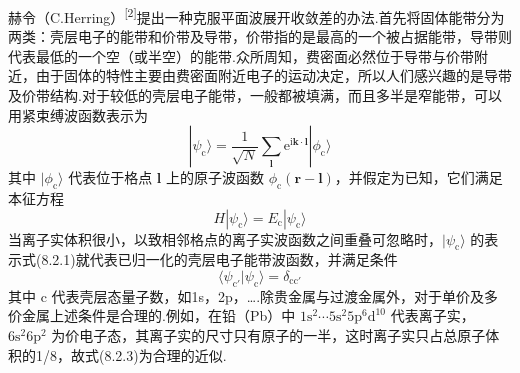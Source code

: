 赫令（C.Herring）\textsuperscript{[2]}提出一种克服平面波展开收敛差的办法.首先将固体能带分为两类：壳层电子的能带和价带及导带，价带指的是最高的一个被占据能带，导带则代表最低的一个空（或半空）的能带.众所周知，费密面必然位于导带与价带附近，由于固体的特性主要由费密面附近电子的运动决定，所以人们感兴趣的是导带及价带结构.对于较低的壳层电子能带，一般都被填满，而且多半是窄能带，可以用紧束缚波函数表示为
\begin{equation}
  |\psi_{\mathrm{c}}\rangle=\frac{1}{\sqrt{N}}\sum_{\boldsymbol{l}}\mathrm{e}^{\mathrm{i}\boldsymbol{k}\cdot\boldsymbol{l}}|\phi_{\mathrm{c}}\rangle
\end{equation}
其中 $|\phi_{\mathrm{c}}\rangle$ 代表位于格点 $\boldsymbol{l}$ 上的原子波函数 $\phi_{\mathrm{c}}(\boldsymbol{r}-\boldsymbol{l})$，并假定为已知，它们满足本征方程
\begin{equation}
  H|\psi_{\mathrm{c}}\rangle=E_{\mathrm{c}}|\psi_{\mathrm{c}}\rangle
\end{equation}
当离子实体积很小，以致相邻格点的离子实波函数之间重叠可忽略时，$|\psi_{\mathrm{c}}\rangle$ 的表示式(8.2.1)就代表已归一化的壳层电子能带波函数，并满足条件
\begin{equation}
  \langle\psi_{\mathrm{c}'}|\psi_{\mathrm{c}}\rangle=\delta_{\mathrm{cc}'}
\end{equation}
其中 $\mathrm{c}$ 代表壳层态量子数，如1s，2p，….除贵金属与过渡金属外，对于单价及多价金属上述条件是合理的.例如，在铅（Pb）中 $1\mathrm{s}^{2}\cdots5\mathrm{s}^{2}5\mathrm{p}^{6}\mathrm{d}^{10}$ 代表离子实，$6\mathrm{s}^{2}6\mathrm{p}^{2}$ 为价电子态，其离子实的尺寸只有原子的一半，这时离子实只占总原子体积的1/8，故式(8.2.3)为合理的近似.

